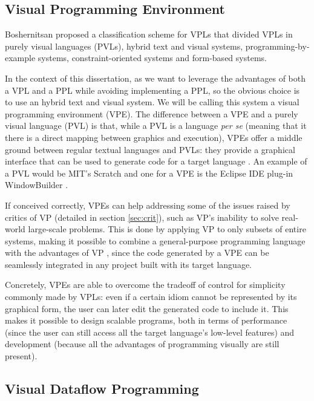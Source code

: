 \subsection{Visual Programming Environment}
\label{sec:vpe}

Boshernitsan proposed a classification scheme for VPLs \cite{Boshernitsan2004}
that divided VPLs in purely visual languages (PVLs), hybrid text and visual systems,
programming-by-example systems, constraint-oriented systems and form-based systems.

In the context of this dissertation, as we want to leverage the advantages of
both a VPL and a PPL while avoiding implementing a PPL, so the obvious choice
is to use an hybrid text and visual system. We will be calling this system a
visual programming environment (VPE). The difference between a VPE and a purely visual language (PVL)
is that, while a PVL is a language \textit{per se} (meaning that it there
is a direct mapping between graphics and execution), VPEs offer a middle ground
between regular textual languages and PVLs: they provide a graphical interface
that can be used to generate code for a target language \cite{Burnett1999}.
An example of a PVL would be MIT's Scratch \cite{resnick2009scratch} and one for
a VPE is the Eclipse IDE plug-in WindowBuilder \cite{winbuild}.

If conceived
correctly, VPEs can help addressing some of the issues raised by critics of VP (detailed in section \ref{sec:crit}),
such as VP's inability to solve real-world large-scale problems. This is done
by applying VP to only subsets of entire systems, making it possible to combine
a general-purpose programming language with the advantages of VP \cite{Burnett1999},
since the code generated by a VPE can be seamlessly integrated in any project
built with its target language.

Concretely, VPEs are able to overcome the tradeoff of control for simplicity
commonly made by VPLs: even if a certain idiom cannot be represented by its
graphical form, the user can later edit the generated code to include it. This
makes it possible to design scalable programs, both in terms of performance
(since the user can still access all the target language's low-level features) and development
(because all the advantages of programming visually are still present).

\subsection{Visual Dataflow Programming}


